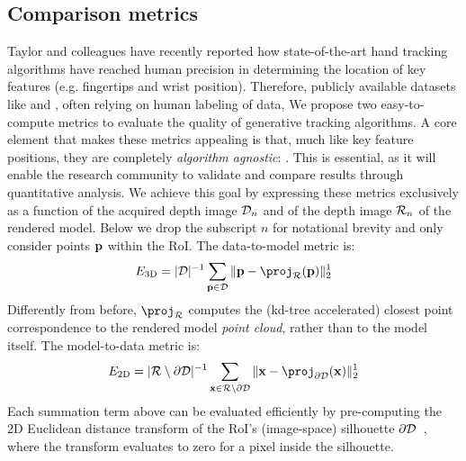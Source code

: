 \subsection*{Comparison metrics}
Taylor and colleagues \cite{taylor2016concerto} have recently reported how state-of-the-art hand tracking algorithms have reached human precision in determining the location of key features (e.g. fingertips and wrist position). 
Therefore, publicly available datasets like \cite{tompson2014real} and \cite{sridhar2013multicam}, often relying on human labeling of data, 
% 
We propose two easy-to-compute metrics to evaluate the quality of generative tracking algorithms. A core element that makes these metrics appealing is that, much like key feature positions, they are completely \emph{algorithm agnostic}: . This is essential, as it will enable the research community to validate and compare results through quantitative analysis. 
% 
We achieve this goal by expressing these metrics exclusively as a function of the acquired depth image $\mathcal{D}_n$ and of the depth image $\mathcal{R}_{n}$ of the rendered model. 
Below we drop the subscript $n$ for notational brevity and only consider points  $\mathbf{p}$ within the RoI.
% 
The data-to-model metric is: %
% 
\begin{equation}
\metricone = |\depth|^{-1} \sum_{\pointHmodel \in \depth} \| \pointHmodel - \proj_\depthrend(\pointHmodel) \|_2^1
\label{eq:metric1}
\end{equation}
% 
Differently from before, $\proj_\depthrend$ computes the (kd-tree accelerated) closest point correspondence to the rendered model \emph{point cloud}, rather than to the model itself. 
% 
The model-to-data metric is: %
\begin{eqnarray}
\metrictwo = |\depthrend \setminus \partial\depth|^{-1} 
\sum_{\pixelHmodel \in \depthrend \setminus \partial\depth} \| \pixelHmodel - \proj_{\partial\depth}(\pixelHmodel) \|^1_2
\label{eq:metric2}
\end{eqnarray}
%
Each summation term above can be evaluated efficiently by pre-computing the 2D Euclidean distance transform of the RoI's (image-space) silhouette $\partial \mathcal{D}$~\cite{tagliasacchi2015robust}, where the transform evaluates to zero for a pixel inside the silhouette.
% 

